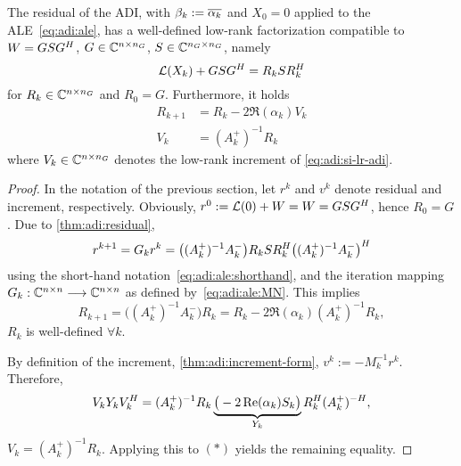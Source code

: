 \begin{theorem}
  The residual of the \ac{ADI},
  with $\beta_k := \conj{\alpha_k}$ and $X_0=0$ applied to the \ac{ALE}~\eqref{eq:adi:ale},
  has a well-defined low-rank factorization compatible to $W = GSG^H$,
  $G\in\mathbb{C}^{n\times n_G}$, $S\in\mathbb{C}^{n_G\times n_G}$, namely
  \begin{equation*}
    \operatorname{\mathcal L}(X_k) + G S G^H = R_k S R_k^H
  \end{equation*}
  for $R_k \in\mathbb{C}^{n\times n_G}$ and $R_0 = G$.
  Furthermore, it holds
  \begin{align*}
    R_{k+1} &= R_k - 2\Re(\alpha_k) V_k \\
    V_k &= (A_k^+)^{-1} R_k
  \end{align*}
  where $V_k \in\mathbb{C}^{n\times n_G}$ denotes the low-rank increment of \eqref{eq:adi:si-lr-adi}.
\end{theorem}
\begin{proof}
  In the notation of the previous section,
  let $r^k$ and $v^k$ denote residual and increment, respectively.
  Obviously, $r^0 := \operatorname{\mathcal L}(0) + W = W = GSG^H$, hence $R_0 = G$.
  Due to \autoref{thm:adi:residual},
  \begin{equation*}
    r^{k+1}
    = G_k r^k
    = \big( (A_k^+)^{-1} A_k^- \big)
    R_k S R_k^H
    \big( (A_k^+)^{-1} A_k^- \big)^H
  \end{equation*}
  using the short-hand notation~\eqref{eq:adi:ale:shorthand},
  and the iteration mapping $G_k : \mathbb{C}^{n\times n}\longrightarrow\mathbb{C}^{n\times n}$ as defined by~\eqref{eq:adi:ale:MN}.
  This implies
  \begin{equation*}
  \tag{$\ast$}
    R_{k+1}
    = \big( (A_k^+)^{-1} A_k^- \big) R_k
    = R_k - 2\Re(\alpha_k) (A_k^+)^{-1} R_k
    ,
  \end{equation*}
  \ie $R_k$ is well-defined $\forall k$.

  By definition of the increment,
  \cf \autoref{thm:adi:increment-form},
  $v^k := -M_k^{-1} r^k$.
  Therefore,
  \begin{equation*}
    V_k Y_k V_k^H
    = (A_k^+)^{-1} R_k
    \underbrace{
      \big( -2 \operatorname{Re}(\alpha_k) S_k \big)
    }_{Y_k}
    R_k^H (A_k^+)^{-H}
    ,
  \end{equation*}
  \ie $V_k = (A_k^+)^{-1} R_k$.
  Applying this to $(\ast)$ yields the remaining equality.
\end{proof}

